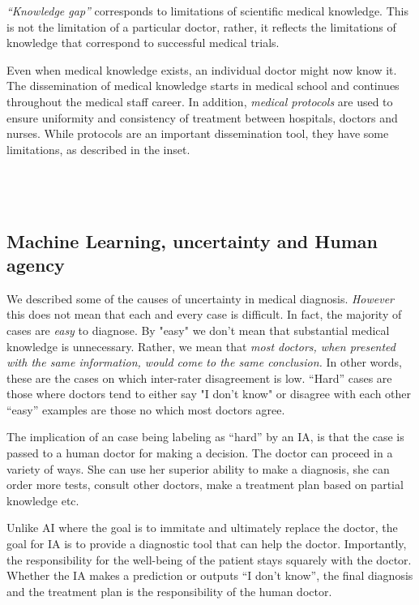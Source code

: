 \documentclass[11pt]{pnas-new}
\begin{document}
{\em ``Knowledge gap''} corresponds to limitations of scientific medical
knowledge. This is not the limitation of a particular doctor, rather,
it reflects the limitations of knowledge that correspond to successful
medical trials.


Even when medical knowledge exists, an individual doctor might now
know it. The dissemination of medical knowledge starts in medical
school and continues throughout the medical staff career. In addition,
{\em medical protocols} are used to ensure uniformity and
consistency of treatment between hospitals, doctors and nurses. While
protocols are an important dissemination tool, they have some limitations, 
as described in the inset.
~\\~\\~\\~\\

\subsection{Machine Learning, uncertainty and Human agency}

We described some of the causes of uncertainty in medical
diagnosis.  {\em However} this does
not mean that each and every case is difficult. In fact, the majority
of cases are {\em easy} to diagnose. By "easy" we don't mean that
substantial medical knowledge is unnecessary. Rather, we mean that
{\em most doctors, when presented with the same information, would come to
the same conclusion.} In other words, these are the cases on which
inter-rater disagreement is low.   ``Hard'' cases are those where doctors tend to either say "I
don't know" or disagree with each other ``easy'' examples are those
no which most doctors agree.

The implication of an case being labeling as ``hard'' by an IA, is
that the case is passed to a human doctor for making a decision. The
doctor can proceed in a variety of ways. She can use her superior
ability to make a diagnosis, she can order more tests, consult other
doctors, make a treatment plan based on partial knowledge etc.

Unlike AI where the goal is to immitate and ultimately replace the
doctor, the goal for IA is to provide a diagnostic tool that can help
the doctor. Importantly, the responsibility for the well-being of the
patient stays squarely with the doctor. Whether the IA makes a
prediction or outputs ``I don't know'', the final diagnosis and the
treatment plan is the responsibility of the human doctor.
\end{document}
